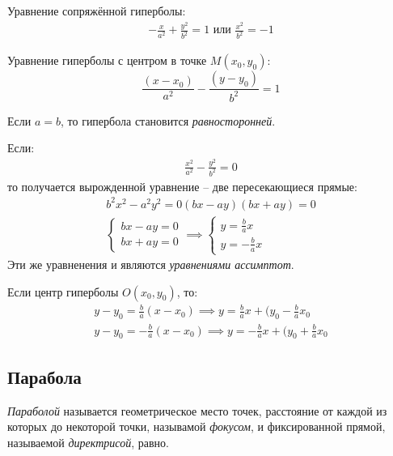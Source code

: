 \begin{note}
  Уравнение сопряжённой гиперболы:
  \begin{gather*}
    \boxed{-\frac{x}{a^2} + \frac{y^2}{b^2} = 1} \text{ или } \boxed{\frac{x^2}{b^2} = -1} 
  \end{gather*} 

  Уравнение гиперболы с центром в точке $M(x_0, y_0)$: \[
  \frac{(x - x_0)}{a^2} - \frac{(y - y_0)}{b^2} = 1
  \] 

  Если $a = b$, то гипербола становится \textit{равносторонней}.

  Если: 
  \begin{gather*}
    \frac{x^2}{a^2} - \frac{y^2}{b^2} = 0
  \end{gather*}
  то получается вырожденной уравнение -- две пересекающиеся прямые:
  \begin{gather*}
    b^2x^2 - a^2y^2 = 0
    (bx - ay)(bx + ay) = 0 \\
    \begin{cases}
      bx - ay = 0 \\
      bx + ay = 0
    \end{cases} \implies 
    \begin{cases}
      y = \frac{b}{a} x \\
      y = - \frac{b}{a} x
    \end{cases}
  \end{gather*}
  Эти же уравненения и являются \textit{уравнениями ассимптот}. 
  
  Если центр гиперболы $O(x_0, y_0)$, то: 
  \begin{gather*}
  y - y_0 = \frac{b}{a}(x - x_0) \implies y = \frac{b}{a}x + (y_0 - \frac{b}{a}x_0 \\
  y - y_0 = -\frac{b}{a}(x - x_0) \implies y = -\frac{b}{a}x + (y_0 + \frac{b}{a}x_0
  \end{gather*}
\end{note}

\subsection{Парабола}

\begin{definition}
  \textit{Параболой} называется геометрическое место точек, расстояние от каждой из которых до некоторой точки, называмой \textit{фокусом}, и фиксированной прямой, называемой \textit{директрисой}, равно.
\end{definition}

